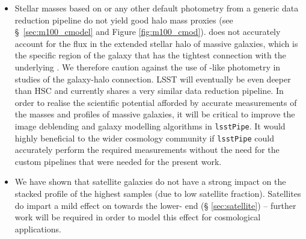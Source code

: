 \documentclass[fleqn,usenatbib,useAMS]{mnras}
\begin{document}
\begin{itemize}
        \item Stellar masses based on \cmodel{} or any other default photometry from a generic data
            reduction pipeline do not yield good halo mass proxies (see \S\ \ref{sec:m100_cmodel}
            and Figure \ref{fig:m100_cmod}).
            \cmodel{} does not accurately account for the flux in the extended stellar halo of
            massive galaxies, which is the specific region of the galaxy that has the tightest
            connection with the underlying \mvir{}.
            We therefore caution against the use of \cmodel{}-like photometry in studies of the
            galaxy-halo connection. 
            LSST will eventually be even deeper than HSC and currently shares a very similar data
            reduction pipeline. 
            In order to realise the scientific potential afforded by accurate measurements of the
            masses and profiles of massive galaxies, it will be critical to improve the image
            deblending and galaxy modelling algorithms in \texttt{lsstPipe}. 
            It would highly beneficial to the wider cosmology community if \texttt{lsstPipe} could
            accurately perform the required measurements without the need for the custom pipelines
            that were needed for the present work.

        \item We have shown that satellite galaxies do not have a strong impact on the stacked
            \dsigma{} profile of the highest \mstar{} samples (due to low satellite fraction).
            Satellites do impart a mild effect on \dsigma{} towards the lower-\mstar{} end (\S
            \ref{sec:satellite}) -- further work will be required in order to model this effect for
            cosmological applications.

    \end{itemize}
\end{document}
